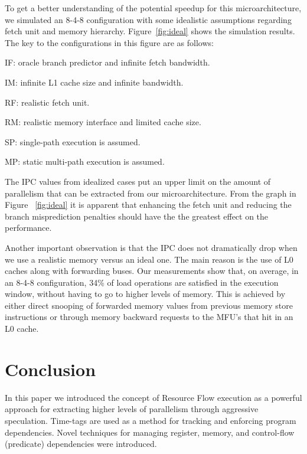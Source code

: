 \documentclass[10pt,twocolumn]{IEEEtran}
\begin{document}
To get a better understanding of the potential speedup for this
microarchitecture, we simulated an 8-4-8 configuration with
some idealistic assumptions regarding fetch unit and memory
hierarchy.  Figure~\ref{fig:ideal} shows the simulation results.
The key to the configurations in this figure are as follows:
%
\begin{itemize}
\small{
\item IF: oracle branch predictor and infinite fetch bandwidth.
\item IM: infinite L1 cache size and infinite bandwidth.
\item RF: realistic fetch unit.
\item RM: realistic memory interface and limited cache size.
\item SP: single-path execution is assumed.
\item MP: static multi-path execution is assumed.
}
\end{itemize}
%
The IPC values from idealized cases put an upper limit on the amount of
parallelism that can be extracted from our microarchitecture.  From 
the graph in Figure ~\ref{fig:ideal} it is apparent that enhancing 
the fetch unit and reducing the branch misprediction penalties
should have the the greatest effect on the performance.  
%
\begin{figure*}[h]
\caption{Comparing ideal and realistic configurations.}
\label{fig:ideal}
\end{figure*}
%
Another important observation is that the IPC does not dramatically
drop when we use a realistic memory versus an ideal one.  The main 
reason is the use of L0 caches along with forwarding buses.  Our 
measurements show that, on average, in an 8-4-8 configuration, 34\% of
load operations are satisfied in the execution window, without having to
go to higher levels of memory.  This is achieved by either direct snooping
of forwarded memory values from previous memory store instructions
or through memory backward requests to the MFU's that
hit in an L0 cache.
%
%
%
%
\section{Conclusion}
%
In this paper we introduced the concept of Resource Flow execution
as a powerful approach for extracting higher levels of
parallelism through aggressive speculation.  Time-tags are used as a
method for tracking and enforcing program dependencies.  Novel
techniques for managing register, memory, and 
control-flow (predicate) dependencies were introduced.
\end{document}
